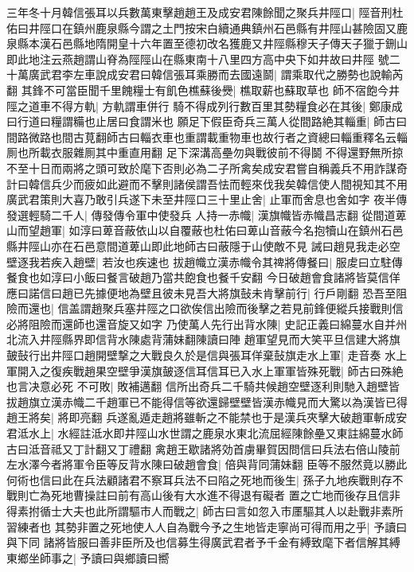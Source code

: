 三年冬十月韓信張耳以兵數萬東擊趙趙王及成安君陳餘聞之聚兵井陘口|{
	陘音刑杜佑曰井陘口在鎮州鹿泉縣今謂之土門按宋白續通典鎮州石邑縣有井陘山甚險固又鹿泉縣本漢石邑縣地隋開皇十六年置至德初改名獲鹿又井陘縣穆天子傳天子獵于鉶山即此地注云燕趙謂山脊為陘陘山在縣東南十八里四方高中央下如井故曰井陘}
號二十萬廣武君李左車說成安君曰韓信張耳乘勝而去國遠鬬|{
	謂乘取代之勝勢也說輸芮翻}
其鋒不可當臣聞千里餽糧士有飢色樵蘇後㸑|{
	樵取薪也蘇取草也}
師不宿飽今井陘之道車不得方軌|{
	方軌謂車併行}
騎不得成列行數百里其勢糧食必在其後|{
	鄭康成曰行道曰糧謂糒也止居曰食謂米也}
願足下假臣奇兵三萬人從間路絶其輜重|{
	師古曰間路微路也間古莧翻師古曰輜衣車也重謂載重物車也故行者之資總曰輜重釋名云輜厠也所載衣服雜厠其中重直用翻}
足下深溝高壘勿與戰彼前不得鬬不得還野無所掠不至十日而兩將之頭可致於麾下否則必為二子所禽矣成安君嘗自稱義兵不用詐謀奇計曰韓信兵少而疲如此避而不擊則諸侯謂吾怯而輕來伐我矣韓信使人間視知其不用廣武君策則大喜乃敢引兵遂下未至井陘口三十里止舍|{
	止軍而舍息也舍如字}
夜半傳發選輕騎二千人|{
	傳發傳令軍中使發兵}
人持一赤幟|{
	漢旗幟皆赤幟昌志翻}
從間道萆山而望趙軍|{
	如淳曰萆音蔽依山以自覆蔽也杜佑曰萆山音蔽今名抱犢山在鎮州石邑縣井陘山亦在石邑意間道萆山即此地師古曰蔽隱于山使敵不見}
誡曰趙見我走必空壁逐我若疾入趙壁|{
	若汝也疾速也}
拔趙幟立漢赤幟令其禆將傳餐曰|{
	服䖍曰立駐傳餐食也如淳曰小飯曰餐言破趙乃當共飽食也餐千安翻}
今日破趙會食諸將皆莫信佯應曰諾信曰趙已先據便地為壁且彼未見吾大將旗鼔未肯擊前行|{
	行戶剛翻}
恐吾至阻險而還也|{
	信盖謂趙聚兵塞井陘之口欲俟信出險而後擊之若見前鋒便縱兵接戰則信必將阻險而還師也還音旋又如字}
乃使萬人先行出背水陳|{
	史記正義曰綿蔓水自并州北流入井陘縣界即信背水陳處背蒲妹翻陳讀曰陣}
趙軍望見而大笑平旦信建大將旗皷鼔行出井陘口趙開壁撃之大戰良久於是信與張耳佯棄鼔旗走水上軍|{
	走音奏}
水上軍開入之復疾戰趙果空壁爭漢旗皷逐信耳信耳已入水上軍軍皆殊死戰|{
	師古曰殊絶也言决意必死}
不可敗|{
	敗補邁翻}
信所出奇兵二千騎共候趙空壁逐利則馳入趙壁皆拔趙旗立漢赤幟二千趙軍已不能得信等欲還歸壁壁皆漢赤幟見而大驚以為漢皆已得趙王將矣|{
	將即亮翻}
兵遂亂遁走趙將雖斬之不能禁也于是漢兵夾擊大破趙軍斬成安君泜水上|{
	水經註泜水即井陘山水世謂之鹿泉水東北流屈經陳餘壘又東註綿蔓水師古曰泜音祗又丁計翻又丁禮翻}
禽趙王歇諸將効首虜畢賀因問信曰兵法右倍山陵前左水澤今者將軍令臣等反背水陳曰破趙會食|{
	倍與背同蒲妹翻}
臣等不服然竟以勝此何術也信曰此在兵法顧諸君不察耳兵法不曰陷之死地而後生|{
	孫子九地疾戰則存不戰則亡為死地曹操註曰前有高山後有大水進不得退有礙者}
置之亡地而後存且信非得素拊循士大夫也此所謂驅市人而戰之|{
	師古曰言如忽入市㕓驅其人以赴戰非素所習練者也}
其勢非置之死地使人人自為戰今予之生地皆走寧尚可得而用之乎|{
	予讀曰與下同}
諸將皆服曰善非臣所及也信募生得廣武君者予千金有縛致麾下者信解其縛東鄉坐師事之|{
	予讀曰與鄉讀曰嚮}

